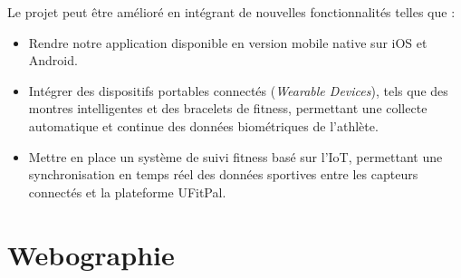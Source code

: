 \documentclass[a4paper,12pt]{report}
\begin{document}
Le projet peut être amélioré en intégrant de nouvelles fonctionnalités telles que :

\begin{itemize}[label=]
    \item Rendre notre application disponible en version mobile native sur iOS et Android.
    \item Intégrer des dispositifs portables connectés (\textit{Wearable Devices}), tels que des montres intelligentes et des bracelets de fitness, permettant une collecte automatique et continue des données biométriques de l'athlète.
    \item Mettre en place un système de suivi fitness basé sur l'IoT, permettant une synchronisation en temps réel des données sportives entre les capteurs connectés et la plateforme UFitPal.
\end{itemize}
\chapter*{Webographie}
\thispagestyle{empty}
\end{document}
